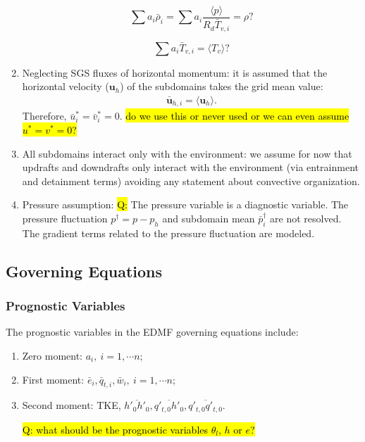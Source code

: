 \documentclass{report}
\begin{document}
\begin{enumerate}
$$\sum a_i \bar{\rho}_i = \sum a_i \frac{\langle p \rangle}{R_d\bar{T}_{v,i}} = \rho ?$$

$$\sum a_i \bar{T}_{v,i} = \langle {T}_v \rangle ?$$
\item Neglecting SGS fluxes of horizontal momentum: it is assumed that the horizontal velocity ($\mathbf{u}_h$) of the subdomains takes the grid mean value:
\begin{eqnarray}
    \bar{\mathbf{u}}_{h,i} = \langle \mathbf{u}_h \rangle.
\end{eqnarray}
Therefore, $\bar{u}_i^* = \bar{v}_i^* = 0$. \hl{do we use this or never used or we can even assume $u^* = v^* = 0$? }
\item All subdomains interact only with the environment: we assume for now that updrafts and downdrafts only interact with the environment (via entrainment and detainment terms) avoiding any statement about convective organization.

\item Pressure assumption: \hl{Q:} The pressure variable is a diagnostic variable. The pressure fluctuation $p^{\dagger} = p - p_h$ and subdomain mean $\bar{p}_i^{\dagger}$ are not resolved. The gradient terms related to the pressure fluctuation are modeled.
\end{enumerate}



\subsection{Governing Equations} \label{sec:Governing Equations}
\subsubsection{Prognostic Variables}
The prognostic variables in the EDMF governing equations include:
\begin{enumerate}
\item  Zero moment: $a_i,\ i=1,\cdots n$; 
\item First moment: $\bar{e}_i , \bar{q}_{t,i} , \bar{w}_i,\ i=1,\cdots n$; 
\item Second moment: TKE, $\overline{h'_0 h'_0}, \overline{q'_{t,0} h'_0}, \overline{q'_{t,0} q'_{t,0}}$.

\hl{Q: what should be the prognostic variables $\theta_l$, $h$ or $e$?}
\end{enumerate}
\end{document}
